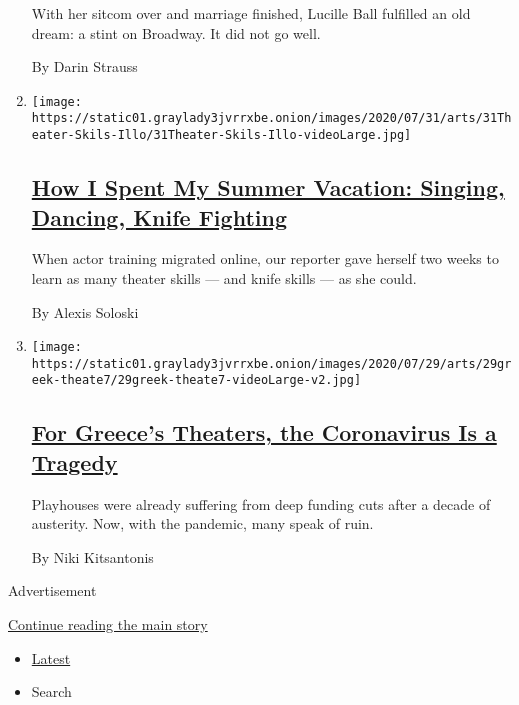 \begin{enumerate}
  With her sitcom over and marriage finished, Lucille Ball fulfilled an
  old dream: a stint on Broadway. It did not go well.

  By Darin Strauss
\item
  \texttt{[image: https://static01.graylady3jvrrxbe.onion/images/2020/07/31/arts/31Theater-Skils-Illo/31Theater-Skils-Illo-videoLarge.jpg]}

  \hypertarget{how-i-spent-my-summer-vacation-singing-dancing-knife-fighting}{%
  \subsection{\texorpdfstring{\href{/2020/07/30/theater/theater-classes-at-home.html}{How
  I Spent My Summer Vacation: Singing, Dancing, Knife
  Fighting}}{How I Spent My Summer Vacation: Singing, Dancing, Knife Fighting}}\label{how-i-spent-my-summer-vacation-singing-dancing-knife-fighting}}

  When actor training migrated online, our reporter gave herself two
  weeks to learn as many theater skills --- and knife skills --- as she
  could.

  By Alexis Soloski
\item
  \texttt{[image: https://static01.graylady3jvrrxbe.onion/images/2020/07/29/arts/29greek-theate7/29greek-theate7-videoLarge-v2.jpg]}

  \hypertarget{for-greeces-theaters-the-coronavirus-is-a-tragedy}{%
  \subsection{\texorpdfstring{\href{/2020/07/30/theater/greece-theater-austerity-coronavirus.html}{For
  Greece's Theaters, the Coronavirus Is a
  Tragedy}}{For Greece's Theaters, the Coronavirus Is a Tragedy}}\label{for-greeces-theaters-the-coronavirus-is-a-tragedy}}

  Playhouses were already suffering from deep funding cuts after a
  decade of austerity. Now, with the pandemic, many speak of ruin.

  By Niki Kitsantonis
\end{enumerate}

Advertisement

\protect\hyperlink{after-mid1}{Continue reading the main story}

\begin{itemize}
\tightlist
\item
  \protect\hyperlink{stream-panel}{Latest}
\item
  Search
\end{itemize}


